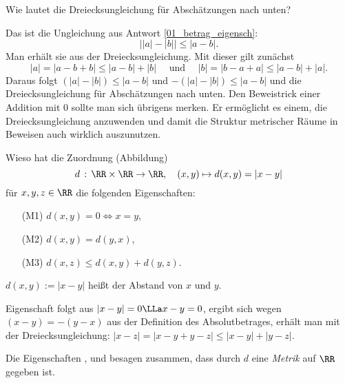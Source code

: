 \begin{frage}
  \label{01_dru}
  Wie lautet die Dreiecksungleichung für Abschätzungen
  nach unten?
\end{frage}

\begin{antwort}
  Das ist die Ungleichung  aus Antwort \ref{01_betrag_eigensch}:
  \[
  \boxed{
    \big| |a|-|b| \big| \le |a-b|. 
  }
  \]
  Man erhält sie aus der Dreiecksungleichung. Mit dieser gilt zunächst
  \[
  |a| = |a-b+b| \le |a-b|+|b| \quad\text{ und } \quad
  |b| = |b-a+a| \le |a-b|+|a|.
  \]
  Daraus folgt $(|a|-|b|)\le |a-b|$ und $-(|a|-|b|)\le |a-b|$ und die 
  Dreiecksungleichung für Abschätzungen nach unten.  Den Beweistrick einer 
  Addition mit $0$ sollte man sich übrigens merken. 
  Er ermöglicht es einem, die Dreiecksungleichung anzuwenden und damit 
  die Struktur metrischer Räume in Beweisen auch wirklich auszunutzen.
  \AntEnd
\end{antwort}


\begin{frage}\label{q:metrischer-raum}
  Wieso hat die Zuordnung (Abbildung) 
  \[
  d\,:\, \RR \times \RR \to \RR, \quad (x,y) \mapsto d(x,y)=|x-y| 
  \]
  für $x,y,z\in\RR$ die folgenden Eigenschaften:
  \begin{itemize}[14mm]
  \item[(M1)] $d(x,y)=0 \Leftrightarrow x=y$,\\[-3.5mm]
  \item[(M2)] $d(x,y)=d(y,x)$,\\[-3.5mm]
  \item[(M3)] $d(x,z) \le d(x,y)+d(y,z)$.
  \end{itemize}
  \noindent
  $d(x,y) := |x-y|$ heißt der Abstand von $x$ und $y$.
\end{frage}

\begin{antwort}
  Eigenschaft  folgt aus $|x-y|=0 \LLa x-y=0$, 
   ergibt sich wegen 
  $(x-y)=-(y-x)$ aus der Definition des Absolutbetrages,  
  erhält man mit der Dreiecksungleichung: 
  $|x-z| = |x-y+y-z| \le |x-y|+|y-z|$. 

  Die Eigenschaften ,  und  besagen zusammen,
  dass durch $d$ eine \textit{Metrik} auf $\RR$ gegeben ist.   
  \AntEnd
  
\end{antwort}

